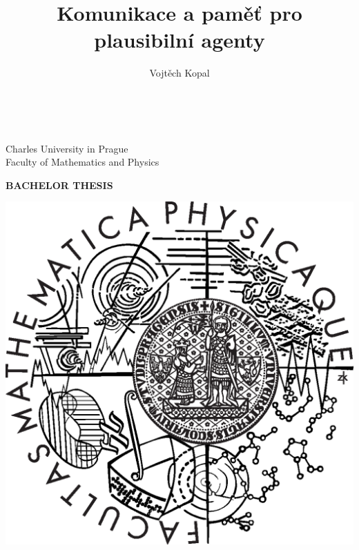 \documentclass[12pt,a4paper]{report}
\title{Komunikace a paměť pro plausibilní agenty}   %
\author{Vojtěch Kopal} %
\begin{document}

\begin{titlepage}
\begin{center}
\ \\

\vspace{15mm}

\large
Charles University in Prague\\
Faculty of Mathematics and Physics\\

\vspace{5mm}
   
{\Large\bf BACHELOR THESIS}

\vspace{10mm}

\includegraphics[scale=0.3]{logo.eps} 


\end{center}
\end{titlepage}
\end{document}
